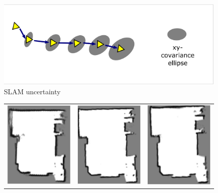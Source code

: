 \documentclass[english]{article}
\begin{document}
\begin{figure}[H]
    \centering
    \includegraphics{Images/Schema_2.PNG}
    \caption{SLAM uncertainty}
    \label{fig:Schema_2}
\end{figure}

\begin{figure}[H]
    \centering
    \begin{tabular}{ccc}
         \includegraphics{Images/Plan_a.PNG} &  
         \includegraphics{Images/Plan_b.PNG} & 
         \includegraphics{Images/Plan_c.PNG} 

\end{tabular}
\end{figure}
\end{document}
